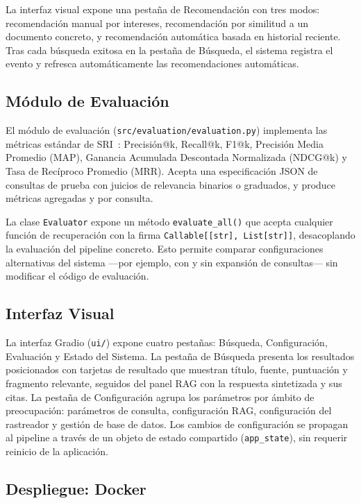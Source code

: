 \documentclass[runningheads,a4paper]{llncs}
\begin{document}
La interfaz visual expone una pestaña de Recomendación con tres modos: recomendación manual por intereses, recomendación por similitud a un documento concreto, y recomendación automática basada en historial reciente. Tras cada búsqueda exitosa en la pestaña de Búsqueda, el sistema registra el evento y refresca automáticamente las recomendaciones automáticas.

\subsection{Módulo de Evaluación}

El módulo de evaluación (\texttt{src/evaluation/evaluation.py}) implementa las métricas estándar de SRI~\cite{manning2008}: Precisión@k, Recall@k, F1@k, Precisión Media Promedio (MAP), Ganancia Acumulada Descontada Normalizada (NDCG@k) y Tasa de Recíproco Promedio (MRR). Acepta una especificación JSON de consultas de prueba con juicios de relevancia binarios o graduados, y produce métricas agregadas y por consulta.

La clase \texttt{Evaluator} expone un método \texttt{evaluate\_all()} que acepta cualquier función de recuperación con la firma \texttt{Callable[[str], List[str]]}, desacoplando la evaluación del pipeline concreto. Esto permite comparar configuraciones alternativas del sistema —por ejemplo, con y sin expansión de consultas— sin modificar el código de evaluación.

\subsection{Interfaz Visual}

La interfaz Gradio (\texttt{ui/}) expone cuatro pestañas: Búsqueda, Configuración, Evaluación y Estado del Sistema. La pestaña de Búsqueda presenta los resultados posicionados con tarjetas de resultado que muestran título, fuente, puntuación y fragmento relevante, seguidos del panel RAG con la respuesta sintetizada y sus citas. La pestaña de Configuración agrupa los parámetros por ámbito de preocupación: parámetros de consulta, configuración RAG, configuración del rastreador y gestión de base de datos. Los cambios de configuración se propagan al pipeline a través de un objeto de estado compartido (\texttt{app\_state}), sin requerir reinicio de la aplicación.


\subsection{Despliegue: Docker}
\end{document}
